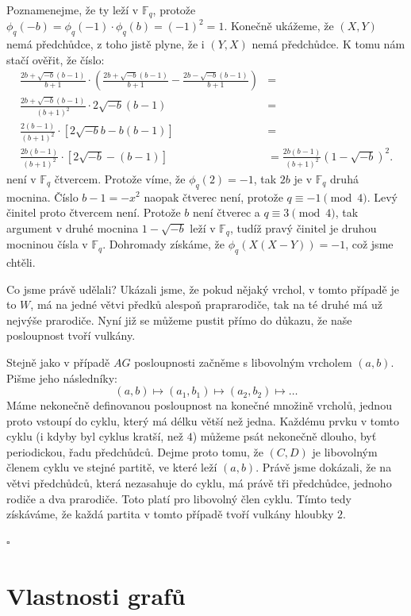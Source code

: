 \documentclass[12pt]{report}
\begin{document}
Poznamenejme, že ty leží v $\mathbb{F}_q$, protože $\phi_q(-b) = \phi_q(-1)\cdot \phi_q(b) = (-1)^2 = 1$. Konečně ukážeme, že $(X,Y)$ nemá předchůdce, z toho jistě plyne, že i $(Y,X)$ nemá předchůdce. K tomu nám stačí ověřit, že číslo:
\begin{align*}
\frac{2b + \sqrt{-b}(b-1)}{b+1} \cdot \left( \frac{2b + \sqrt{-b}(b-1)}{b+1} - \frac{2b - \sqrt{-b}(b-1)}{b+1} \right) &=\\
\frac{2b + \sqrt{-b}(b-1)}{(b+1)^2} \cdot 2 \sqrt{-b}(b-1)&=\\
\frac{2 (b-1)}{(b+1)^2} \cdot [2 \sqrt{-b} b - b(b-1)] &=\\
\frac{2 b(b-1)}{(b+1)^2} \cdot [2 \sqrt{-b}-(b-1)] &= \frac{2 b(b-1)}{(b+1)^2} (1-\sqrt{-b})^2.
\end{align*}
není v $\mathbb{F}_q$ čtvercem. Protože víme, že $\phi_q(2) = -1$, tak $2b$ je v $\mathbb{F}_q$ druhá mocnina. Číslo $b-1 = -x^2$ naopak čtverec není, protože $q \equiv -1 \pmod{4}$. Levý činitel proto čtvercem není. Protože $b$ není čtverec a $q \equiv 3 \pmod{4}$, tak argument v druhé mocnina $1-\sqrt{-b}$ leží v $\mathbb{F}_q$, tudíž pravý činitel je druhou mocninou čísla v $\mathbb{F}_q$. Dohromady získáme, že $\phi_q (X(X-Y)) = -1$, což jsme chtěli. 

Co jsme právě udělali? Ukázali jsme, že pokud nějaký vrchol, v tomto případě je to $W$, má na jedné větvi předků alespoň praprarodiče, tak na té druhé má už nejvýše prarodiče. Nyní již se můžeme pustit přímo do důkazu, že naše posloupnost tvoří vulkány.

Stejně jako v případě $AG$ posloupnosti začněme s libovolným vrcholem $(a,b)$. Pišme jeho následníky:
$$(a,b) \longmapsto (a_1,b_1) \longmapsto (a_2, b_2) \longmapsto \dots$$
Máme nekonečně definovanou posloupnost na konečné množině vrcholů, jednou proto vstoupí do cyklu, který má délku větší než jedna. Každému prvku v tomto cyklu (i kdyby byl cyklus kratší, než $4$) můžeme psát nekonečně dlouho, byť periodickou, řadu předchůdců. Dejme proto tomu, že $(C,D)$ je libovolným členem cyklu ve stejné partitě, ve které leží $(a,b)$. Právě jsme dokázali, že na větvi předchůdců, která nezasahuje do cyklu, má právě tři předchůdce, jednoho rodiče a dva prarodiče. Toto platí pro libovolný člen cyklu. Tímto tedy získáváme, že každá partita v tomto případě tvoří vulkány hloubky $2$.

 \hfill $\square$\\

\section{Vlastnosti grafů}
\end{document}
